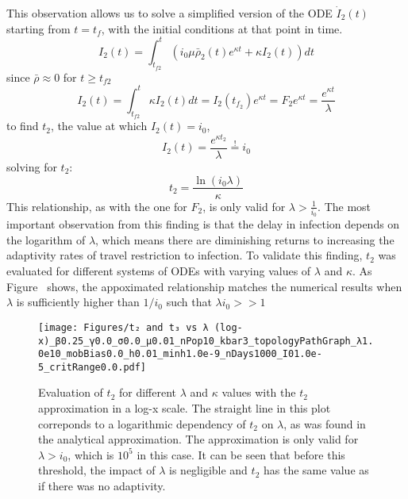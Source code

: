 This observation allows us to solve a simplified version of the ODE $\dot I_2(t)$ starting from $t=t_f$, with the initial conditions at that point in time.
\begin{equation} I_2(t) = \int_{t_{f2}}^t \left(i_{0} \mu \bar \rho_{2}{(t)} e^{\kappa t} + \kappa I_{2}{\left(t \right)}\right) dt\end{equation}
since $\bar \rho \approx 0$ for $t\ge t_{f2}$ 
\begin{equation}I_2(t) = \int_{t_{f2}}^t  \kappa I_{2}{\left(t \right)} dt = I_2(t_{f_2})e^{\kappa t} = F_2 e^{\kappa t} =\frac{e^{\kappa t}}{\lambda}\end{equation}
to find $t_2$, the value at which $I_2(t)=i_0$, 
\begin{equation}I_2(t) =\frac{e^{\kappa t_2}}{\lambda}\stackrel{!}{=} i_0\end{equation}
solving for $t_2$:
\begin{equation}t_2=\frac{\ln(i_0 \lambda)}{\kappa}\end{equation}
This relationship, as with the one for $F_2$, is only valid for $\lambda> \frac{1}{i_0}$. The most important observation from this finding is that the delay in infection depends on the logarithm of $\lambda$, which means there are diminishing returns to increasing the adaptivity rates of travel restriction to infection. To validate this finding, $t_2$ was evaluated for different systems of ODEs with varying values of $\lambda$ and $\kappa$. As Figure~%
shows, the appoximated relationship matches the numerical results when $\lambda$ is sufficiently higher than $1/i_0$ such that $\lambda i_0 >>1$ 



\begin{figure}
    \centering
    \texttt{[image: Figures/t₂ and t₃ vs λ (log-x)\_β0.25\_γ0.0\_σ0.0\_μ0.01\_nPop10\_kbar3\_topologyPathGraph\_λ1.0e10\_mobBias0.0\_h0.01\_minh1.0e-9\_nDays1000\_I01.0e-5\_critRange0.0.pdf]}
    \caption{\small Evaluation of $t_2$ for different $\lambda$ and $\kappa$ values with the $t_2$ approximation in a log-x scale. The straight line in this plot correponds to a logarithmic dependency of $t_2$ on $\lambda$, as was found in the analytical approximation. The approximation is only valid for $\lambda > i_0$, which is $10^5$ in this case. It can be seen that before this threshold, the impact of $\lambda$ is negligible and $t_2$ has the same value as if there was no adaptivity.}
    \label{fig:t_2 and t_3 vs lambda}
\end{figure}

